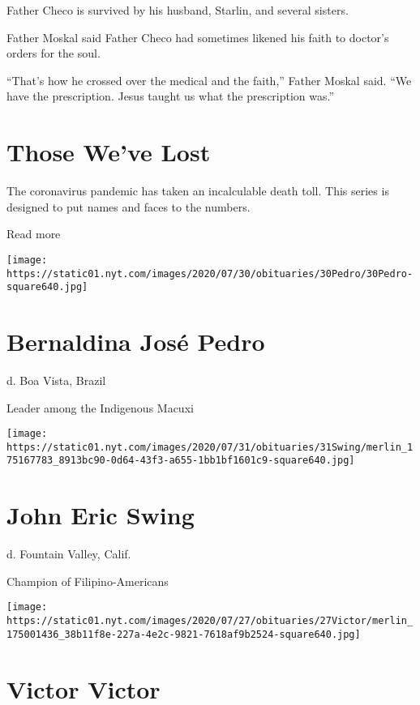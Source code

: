 Father Checo is survived by his husband, Starlin, and several sisters.

Father Moskal said Father Checo had sometimes likened his faith to
doctor's orders for the soul.

``That's how he crossed over the medical and the faith,'' Father Moskal
said. ``We have the prescription. Jesus taught us what the prescription
was.''

\href{https://www.nytimes.com/interactive/2020/obituaries/people-died-coronavirus-obituaries.html?action=click\&pgtype=Article\&state=default\&region=BELOW_MAIN_CONTENT\&context=covid_obits_promo}{}

\hypertarget{those-weve-lost}{%
\section{Those We've Lost}\label{those-weve-lost}}

The coronavirus pandemic has taken an incalculable death toll. This
series is designed to put names and faces to the numbers.

Read more

\texttt{[image: https://static01.nyt.com/images/2020/07/30/obituaries/30Pedro/30Pedro-square640.jpg]}

\hypertarget{bernaldina-josuxe9-pedro}{%
\section{Bernaldina José Pedro}\label{bernaldina-josuxe9-pedro}}

d. Boa Vista, Brazil

Leader among the Indigenous Macuxi

\texttt{[image: https://static01.nyt.com/images/2020/07/31/obituaries/31Swing/merlin\_175167783\_8913bc90-0d64-43f3-a655-1bb1bf1601c9-square640.jpg]}

\hypertarget{john-eric-swing}{%
\section{John Eric Swing}\label{john-eric-swing}}

d. Fountain Valley, Calif.

Champion of Filipino-Americans

\texttt{[image: https://static01.nyt.com/images/2020/07/27/obituaries/27Victor/merlin\_175001436\_38b11f8e-227a-4e2c-9821-7618af9b2524-square640.jpg]}

\hypertarget{victor-victor}{%
\section{Victor Victor}\label{victor-victor}}


